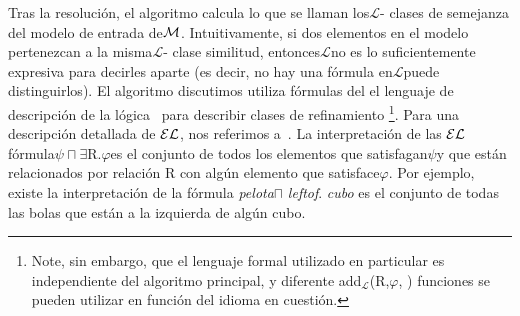 Tras la resoluci\'on, el algoritmo calcula lo que se llaman los$\mathcal {L}$- clases de semejanza del modelo de entrada de$\mathcal{M} $. Intuitivamente, si dos elementos en el modelo pertenezcan a la misma$\mathcal {L}$- clase similitud, entonces$\mathcal {L}$no es lo suficientemente expresiva para decirles aparte (es decir, no hay una f\'ormula en$\mathcal {L }$puede distinguirlos).
El algoritmo discutimos utiliza f\'ormulas del el lenguaje de descripci\'on de la l\'ogica~\cite{baad:desc03} para describir clases de refinamiento \footnote {Note, sin embargo, que el lenguaje formal utilizado en particular es independiente del algoritmo principal, y diferente add$_{\mathcal {L}}$(R,$\varphi $, \RE) funciones se pueden utilizar en funci\'on del idioma en cuesti\'on.}.
Para una descripci\'on detallada de $\mathcal{EL}$, nos referimos a~\cite{baad:desc03}.
La interpretaci\'on de las $\mathcal{EL}$ f\'ormula$\psi \sqcap \exists $R.$ \varphi$es el conjunto de todos los elementos que satisfagan$\psi$y que est\'an relacionados por relaci\'on R con alg\'un elemento que satisface$\varphi $.
Por ejemplo, existe la interpretaci\'on de la f\'ormula \emph{pelota}$\sqcap$ \emph{leftof}. \emph{cubo} es el conjunto de todas las bolas que est\'an a la izquierda de alg\'un cubo.






